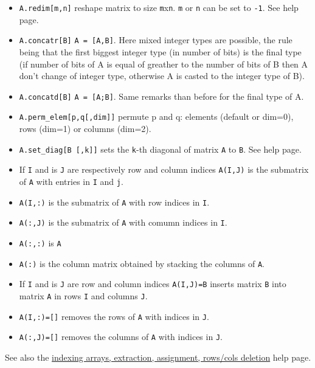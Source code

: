 \begin{itemize}
\item \verb+A.redim[m,n]+ reshape matrix to size \verb+m+x\verb+n+. \verb+m+ or \verb+n+ can be set to \verb+-1+. See
   help page.
\item \verb+A.concatr[B]+ \verb+A = [A,B]+. Here mixed integer types are possible, the rule being that the first biggest
 integer type (in number of bits) is the final type (if number of bits of A is equal of greather to the number of bits 
of B then A don't  change of integer type, otherwise A is casted to the integer type of B). 
\item \verb+A.concatd[B]+ \verb+A = [A;B]+. Same remarks than before for the final type of A.
\item \verb+A.perm_elem[p,q[,dim]]+ permute p and q: elements
  (default or dim=0), rows (dim=1) or columns (dim=2).
\item \verb+A.set_diag[B [,k]]+ sets the \verb+k+-th diagonal of matrix \verb+A+ to \verb+B+. See
   help page.
\end{itemize}

\begin{itemize}
   \item If \verb+I+ and is \verb+J+ are respectively row and column indices \verb+A(I,J)+ is the submatrix of \verb+A+ with entries in \verb+I+ and \verb+j+.
   \item \verb+A(I,:)+ is the submatrix of \verb+A+ with row indices in \verb+I+.
   \item \verb+A(:,J)+ is the submatrix of \verb+A+ with comumn indices in \verb+I+.
   \item \verb+A(:,:)+ is \verb+A+
   \item \verb+A(:)+  is the column matrix obtained by stacking the columns of \verb+A+.
\end{itemize}
\begin{itemize}
   \item If \verb+I+ and is \verb+J+ are row and column indices \verb+A(I,J)=B+ inserts
matrix \verb+B+ into matrix \verb+A+ in rows \verb+I+ and columns \verb!J!.
   \item \verb+A(I,:)=[]+ removes the rows of \verb+A+ with indices in \verb+J+.
   \item \verb+A(:,J)=[]+ removes the columns of \verb+A+ with indices in \verb+J+.
\end{itemize}
See also the \hyperlink{indexing arrays}{indexing arrays, extraction, assignment, rows/cols deletion} help page.


